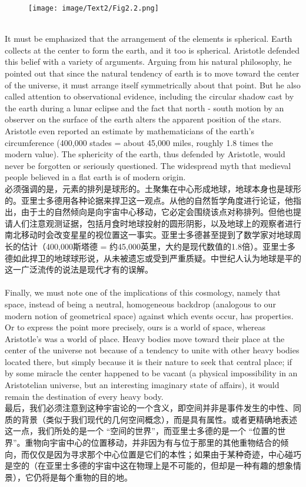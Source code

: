 \documentclass{article}
\begin{document}
\begin{figure}
    \centering
    \texttt{[image: image/Text2/Fig2.2.png]}
\end{figure}

\\
It must be emphasized that the arrangement of the elements is spherical. Earth collects at the center to form the earth, and it too is spherical. Aristotle defended this belief with a variety of arguments. Arguing from his natural philosophy, he pointed out that since the natural tendency of earth is to move toward the center of the universe, it must arrange itself symmetrically about that point. But he also called attention to observational evidence, including the circular shadow cast by the earth during a lunar eclipse and the fact that north - south motion by an observer on the surface of the earth alters the apparent position of the stars. Aristotle even reported an estimate by mathematicians of the earth’s circumference (400,000 stades = about 45,000 miles, roughly 1.8 times the modern value). The sphericity of the earth, thus defended by Aristotle, would never be forgotten or seriously questioned. The widespread myth that medieval people believed in a flat earth is of modern origin.\\
必须强调的是，元素的排列是球形的。土聚集在中心形成地球，地球本身也是球形的。亚里士多德用各种论据来捍卫这一观点。从他的自然哲学角度进行论证，他指出，由于土的自然倾向是向宇宙中心移动，它必定会围绕该点对称排列。但他也提请人们注意观测证据，包括月食时地球投射的圆形阴影，以及地球上的观察者进行南北移动时会改变星星的视位置这一事实。亚里士多德甚至提到了数学家对地球周长的估计（400,000斯塔德 = 约45,000英里，大约是现代数值的1.8倍）。亚里士多德如此捍卫的地球球形说，从未被遗忘或受到严重质疑。中世纪人认为地球是平的这一广泛流传的说法是现代才有的误解。 \\

\\
Finally, we must note one of the implications of this cosmology, namely that space, instead of being a neutral, homogeneous backdrop (analogous to our modern notion of geometrical space) against which events occur, has properties. Or to express the point more precisely, ours is a world of space, whereas Aristotle’s was a world of place. Heavy bodies move toward their place at the center of the universe not because of a tendency to unite with other heavy bodies located there, but simply because it is their nature to seek that central place; if by some miracle the center happened to be vacant (a physical impossibility in an Aristotelian universe, but an interesting imaginary state of affairs), it would remain the destination of every heavy body.\\
最后，我们必须注意到这种宇宙论的一个含义，即空间并非是事件发生的中性、同质的背景（类似于我们现代的几何空间概念），而是具有属性。或者更精确地表述这一点，我们所处的是一个 “空间的世界”，而亚里士多德的是一个 “位置的世界”。重物向宇宙中心的位置移动，并非因为有与位于那里的其他重物结合的倾向，而仅仅是因为寻求那个中心位置是它们的本性；如果由于某种奇迹，中心碰巧是空的（在亚里士多德的宇宙中这在物理上是不可能的，但却是一种有趣的想象情景），它仍将是每个重物的目的地。\\
\end{document}
